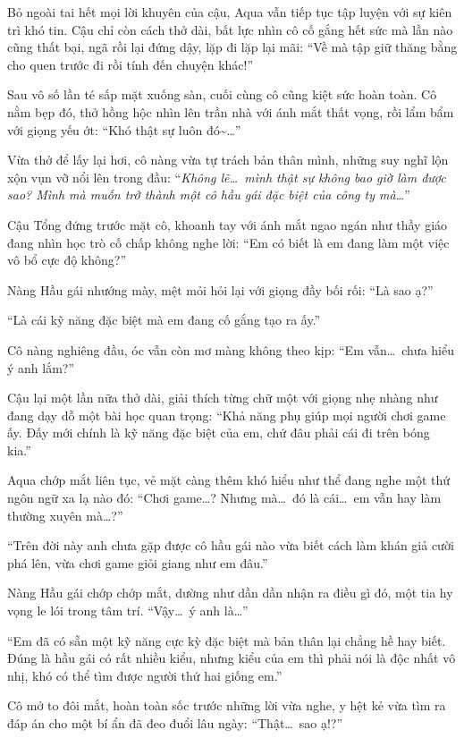 \documentclass[../main.tex]{subfiles}
\begin{document}
Bỏ ngoài tai hết mọi lời khuyên của cậu, Aqua vẫn tiếp tục tập luyện với sự kiên trì khó tin. Cậu chỉ còn cách thở dài, bất lực nhìn cô cố gắng hết sức mà lần nào cũng thất bại, ngã rồi lại đứng dậy, lặp đi lặp lại mãi: ``Về mà tập giữ thăng bằng cho quen trước đi rồi tính đến chuyện khác!''

Sau vô số lần té sấp mặt xuống sàn, cuối cùng cô cũng kiệt sức hoàn toàn. Cô nằm bẹp đó, thở hồng hộc nhìn lên trần nhà với ánh mắt thất vọng, rồi lẩm bẩm với giọng yếu ớt: ``Khó thật sự luôn đó\~{}\dots''

Vừa thở để lấy lại hơi, cô nàng vừa tự trách bản thân mình, những suy nghĩ lộn xộn vụn vỡ nổi lên trong đầu: ``\textit{Không lẽ\dots\ mình thật sự không bao giờ làm được sao? Mình mà muốn trở thành một cô hầu gái đặc biệt của công ty mà\dots}''

Cậu Tổng đứng trước mặt cô, khoanh tay với ánh mắt ngao ngán như thầy giáo đang nhìn học trò cố chấp không nghe lời: ``Em có biết là em đang làm một việc vô bổ cực độ không?''

Nàng Hầu gái nhướng mày, mệt mỏi hỏi lại với giọng đầy bối rối: ``Là sao ạ?''

``Là cái kỹ năng đặc biệt mà em đang cố gắng tạo ra ấy.''

Cô nàng nghiêng đầu, óc vẫn còn mơ màng không theo kịp: ``Em vẫn\dots\ chưa hiểu ý anh lắm?''

Cậu lại một lần nữa thở dài, giải thích từng chữ một với giọng nhẹ nhàng như đang dạy dỗ một bài học quan trọng: ``Khả năng phụ giúp mọi người chơi game ấy. Đấy mới chính là kỹ năng đặc biệt của em, chứ đâu phải cái đi trên bóng kia.''

Aqua chớp mắt liên tục, vẻ mặt càng thêm khó hiểu như thể đang nghe một thứ ngôn ngữ xa lạ nào đó: ``Chơi game\dots? Nhưng mà\dots\ đó là cái\dots\ em vẫn hay làm thường xuyên mà\dots?''

``Trên đời này anh chưa gặp được cô hầu gái nào vừa biết cách làm khán giả cười phá lên, vừa chơi game giỏi giang như em đâu.''

Nàng Hầu gái chớp chớp mắt, dường như dần dần nhận ra điều gì đó, một tia hy vọng le lói trong tâm trí. ``Vậy\dots\ ý anh là\dots''

``Em đã có sẵn một kỹ năng cực kỳ đặc biệt mà bản thân lại chẳng hề hay biết. Đúng là hầu gái có rất nhiều kiểu, nhưng kiểu của em thì phải nói là độc nhất vô nhị, khó có thể tìm được người thứ hai giống em.''

Cô mở to đôi mắt, hoàn toàn sốc trước những lời vừa nghe, y hệt kẻ vừa tìm ra đáp án cho một bí ẩn đã đeo đuổi lâu ngày: ``Thật\dots\ sao ạ!?''
\end{document}
